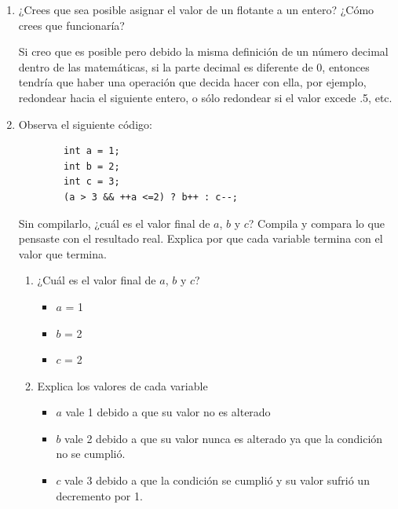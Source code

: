 \documentclass[11pt,letterpaper]{article}
\begin{document}
\begin{enumerate}
    \item ¿Crees que sea posible asignar el valor de un flotante a un entero?
    ¿Cómo crees que funcionaría?

        Si creo que es posible pero debido la misma definición de un número decimal
        dentro de las matemáticas, si la parte decimal es diferente de 0, entonces
        tendría que haber una operación que decida hacer con ella, por ejemplo, redondear
        hacia el siguiente entero, o sólo redondear si el valor excede .5, etc.

    \item Observa el siguiente código:
    \begin{verbatim}
        int a = 1;
        int b = 2;
        int c = 3;
        (a > 3 && ++a <=2) ? b++ : c--;
    \end{verbatim}
    Sin compilarlo, ¿cuál es el valor final de $a$, $b$ y $c$? Compila y compara
    lo que pensaste con el resultado real. Explica por que cada variable termina
    con el valor que termina.

        \begin{enumerate}
            \item ¿Cuál es el valor final de $a$, $b$ y $c$?
                \begin{itemize}
                    \item $a$ = 1
                    \item $b$ = 2
                    \item $c$ = 2
                \end{itemize}
            \item Explica los valores de cada variable
                \begin{itemize}
                    \item $a$ vale 1 debido a que su valor no es alterado
                    \item $b$ vale 2 debido a que su valor nunca es alterado
                    ya que la condición no se cumplió.
                    \item $c$ vale 3 debido a que la condición se cumplió y
                    su valor sufrió un decremento por 1.
                \end{itemize}
        \end{enumerate}

\end{enumerate}
\end{document}
